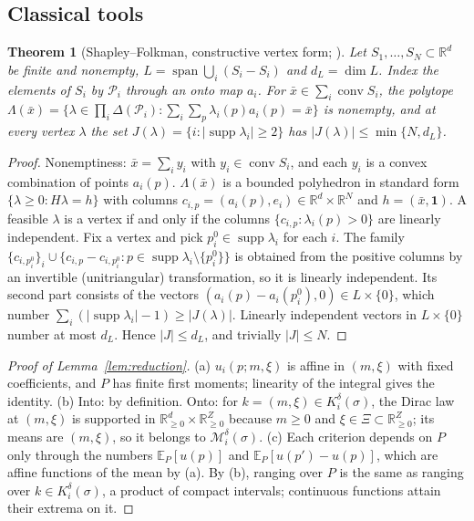 \documentclass[preprint,12pt]{elsarticle}
\newtheorem{theorem}{Theorem}
\theoremstyle{definition}
\theoremstyle{remark}
\newcommand{\R}{\mathbb{R}}
\newcommand{\E}{\mathbb{E}}
\newcommand{\cP}{\mathcal{P}}
\newcommand{\cM}{\mathcal{M}}
\newcommand{\conv}{\operatorname{conv}}
\newcommand{\spn}{\operatorname{span}}
\newcommand{\supp}{\operatorname{supp}}
\begin{document}
\subsection{Classical tools}

\begin{theorem}[Shapley--Folkman, constructive vertex form; \citealp{Starr1969}]\label{thm:sf}
Let $S_1,\dots,S_N\subset\R^d$ be finite and nonempty, $L=\spn\bigcup_i(S_i-S_i)$ and $d_L=\dim L$. Index the elements of $S_i$ by $\cP_i$ through an onto map $a_i$. For $\bar x\in\sum_i\conv S_i$, the polytope $\Lambda(\bar x)=\{\lambda\in\prod_i\Delta(\cP_i):\sum_i\sum_p\lambda_i(p)a_i(p)=\bar x\}$ is nonempty, and at every vertex $\lambda$ the set $J(\lambda)=\{i:|\supp\lambda_i|\ge2\}$ has $|J(\lambda)|\le\min\{N,d_L\}$.
\end{theorem}
\begin{proof}
Nonemptiness: $\bar x=\sum_iy_i$ with $y_i\in\conv S_i$, and each $y_i$ is a convex combination of points $a_i(p)$. $\Lambda(\bar x)$ is a bounded polyhedron in standard form $\{\lambda\ge0:H\lambda=h\}$ with columns $c_{i,p}=(a_i(p),e_i)\in\R^d\times\R^N$ and $h=(\bar x,\mathbf 1)$. A feasible $\lambda$ is a vertex if and only if the columns $\{c_{i,p}:\lambda_i(p)>0\}$ are linearly independent. Fix a vertex and pick $p_i^0\in\supp\lambda_i$ for each $i$. The family $\{c_{i,p_i^0}\}_i\cup\{c_{i,p}-c_{i,p_i^0}:p\in\supp\lambda_i\setminus\{p_i^0\}\}$ is obtained from the positive columns by an invertible (unitriangular) transformation, so it is linearly independent. Its second part consists of the vectors $(a_i(p)-a_i(p_i^0),0)\in L\times\{0\}$, which number $\sum_i(|\supp\lambda_i|-1)\ge|J(\lambda)|$. Linearly independent vectors in $L\times\{0\}$ number at most $d_L$. Hence $|J|\le d_L$, and trivially $|J|\le N$.
\end{proof}

\begin{proof}[Proof of Lemma~\ref{lem:reduction}]
(a) $u_i(p;m,\xi)$ is affine in $(m,\xi)$ with fixed coefficients, and $P$ has finite first moments; linearity of the integral gives the identity. (b) Into: by definition. Onto: for $k=(m,\xi)\in K_i^\delta(\sigma)$, the Dirac law at $(m,\xi)$ is supported in $\R^d_{\ge0}\times\R^Z_{\ge0}$ because $m\ge0$ and $\xi\in\Xi\subset\R^Z_{\ge0}$; its means are $(m,\xi)$, so it belongs to $\cM_i^\delta(\sigma)$. (c) Each criterion depends on $P$ only through the numbers $\E_P[u(p)]$ and $\E_P[u(p')-u(p)]$, which are affine functions of the mean by (a). By (b), ranging over $P$ is the same as ranging over $k\in K_i^\delta(\sigma)$, a product of compact intervals; continuous functions attain their extrema on it.
\end{proof}
\end{document}
